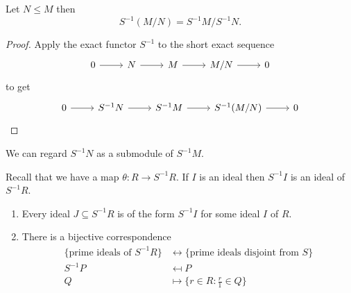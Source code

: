 \documentclass[a4paper]{article}
\begin{document}
\begin{corollary}
  Let \(N \leq M\) then
  \[
    S^{-1}(M/N) = S^{-1}M/S^{-1}N.
  \]
\end{corollary}

\begin{proof}
  Apply the exact functor \(S^{-1}\) to the short exact sequence
  \[
    \begin{tikzcd}
      0 \ar[r] & N \ar[r] & M \ar[r] & M/N \ar[r] & 0
    \end{tikzcd}
  \]
  to get
  \[
    \begin{tikzcd}
      0 \ar[r] & S^{-1}N \ar[r] & S^{-1}M \ar[r] & S^{-1}(M/N) \ar[r] & 0
    \end{tikzcd}
  \]
\end{proof}

\begin{remark}
  We can regard \(S^{-1}N\) as a submodule of \(S^{-1}M\).
\end{remark}

Recall that we have a map \(\theta: R \to S^{-1}R\). If \(I\) is an ideal then \(S^{-1}I\) is an ideal of \(S^{-1}R\).

\begin{lemma}\leavevmode
  \begin{enumerate}
  \item Every ideal \(J \subseteq S^{-1}R\) is of the form \(S^{-1}I\) for some ideal \(I\) of \(R\).
  \item There is a bijective correspondence
    \begin{align*}
      \{\text{prime ideals of } S^{-1}R\} &\leftrightarrow \{\text{prime ideals disjoint from } S\} \\
      S^{-1}P &\mapsfrom P \\
      Q &\mapsto \{r \in R: \frac{r}{1} \in Q\}
    \end{align*}
  \end{enumerate}
\end{lemma}
\end{document}
